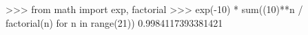 
>>> from math import exp, factorial
>>> exp(-10) * sum((10)**n / factorial(n) for n in range(21))
0.9984117393381421

